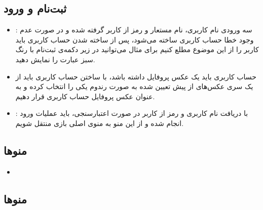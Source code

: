 \documentclass[]{article}
\begin{document}
\subsection*{{\titr ثبت‌نام و ورود}}
\begin{itemize}
    \item {}: سه ورودی نام کاربری، نام مستعار و رمز از کاربر گرفته شده و در صورت عدم وجود خطا حساب کاربری ساخته می‌شود، پس از ساخته شدن حساب کاربری باید کاربر را از این موضوع مطلع کنیم برای مثال می‌توانید در زیر دکمه‌ی ثبت‌نام با رنگ سبز عبارت  را نمایش دهید.
    \item حساب کاربری باید یک عکس پروفایل داشته باشد، با ساختن حساب کاربری باید از یک سری عکس‌های از پیش تعیین شده به صورت رندوم یکی را انتخاب کرده و به عنوان عکس پروفایل حساب کاربری قرار دهیم.
    \item {}: با دریافت نام کاربری و رمز از کاربر در صورت اعتبارسنجی، باید عملیات ورود انجام شده و از این منو به منوی اصلی بازی منتقل شویم.
\end{itemize}

\subsection*{{\titr منوها}}
\begin{itemize}
    \item 
\end{itemize}

\subsection*{{\titr منوها}}
\end{document}
